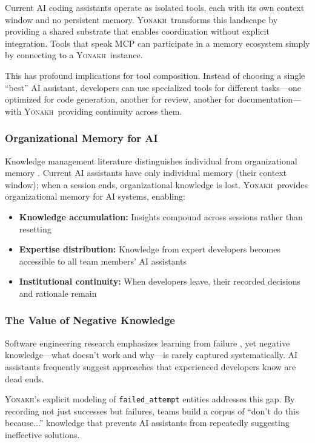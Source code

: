\documentclass[10pt,journal,compsoc]{IEEEtran}
\newcommand{\yonakh}{\textsc{Yonakh}}
\begin{document}
Current AI coding assistants operate as isolated tools, each with its own context window and no persistent memory. \yonakh\ transforms this landscape by providing a shared substrate that enables coordination without explicit integration. Tools that speak MCP can participate in a memory ecosystem simply by connecting to a \yonakh\ instance.

This has profound implications for tool composition. Instead of choosing a single ``best'' AI assistant, developers can use specialized tools for different tasks---one optimized for code generation, another for review, another for documentation---with \yonakh\ providing continuity across them.

\subsubsection{Organizational Memory for AI}

Knowledge management literature distinguishes individual from organizational memory \cite{walsh1991organizational}. Current AI assistants have only individual memory (their context window); when a session ends, organizational knowledge is lost. \yonakh\ provides organizational memory for AI systems, enabling:

\begin{itemize}
\item \textbf{Knowledge accumulation:} Insights compound across sessions rather than resetting
\item \textbf{Expertise distribution:} Knowledge from expert developers becomes accessible to all team members' AI assistants
\item \textbf{Institutional continuity:} When developers leave, their recorded decisions and rationale remain
\end{itemize}

\subsubsection{The Value of Negative Knowledge}

Software engineering research emphasizes learning from failure \cite{parnas1994software}, yet negative knowledge---what doesn't work and why---is rarely captured systematically. AI assistants frequently suggest approaches that experienced developers know are dead ends.

\yonakh's explicit modeling of \texttt{failed\_attempt} entities addresses this gap. By recording not just successes but failures, teams build a corpus of ``don't do this because...'' knowledge that prevents AI assistants from repeatedly suggesting ineffective solutions.
\end{document}
